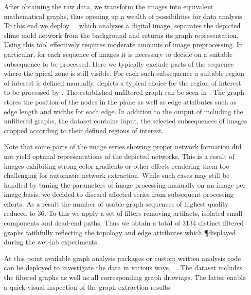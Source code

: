	After obtaining the raw data, we transform the images into equivalent mathematical graphs, thus opening up a wealth of possibilities for data analysis. To this end we deploy \NEFI~\cite{dirnberger2015nefi}, which analyzes a digital image, separates the depicted slime mold network from the background and returns its graph representation. Using this tool effectively requires moderate amounts of image preprocessing. In particular, for each sequence of images it is necessary to decide on a suitable subsequence to be processed. Here we typically exclude parts of the sequence where the apical zone is still visible. For each such subsequence a suitable region of interest is defined manually.  depicts a typical choice for the region of interest to be processed by \NEFI. The established unfiltered graph can be seen in . The graph stores the position of the nodes in the plane as well as edge attributes such as edge length and widths for each edge. In addition to the output of \NEFI including the unfiltered graphs, the dataset contains \NEFIs input, \ie the selected subsequences of images cropped according to their defined regions of interest.

	Note that some parts of the image series showing proper network formation did not yield optimal representations of the depicted networks. This is a result of images exhibiting strong color gradients or other effects rendering them too challenging for automatic network extraction. While such cases may still be handled by tuning the parameters of image processing manually on an image per image basis, we decided to discard affected series from subsequent processing efforts. As a result the number of usable graph sequences of highest quality reduced to $36$. To this we apply a set of filters removing artifacts, isolated small components and dead-end paths. Thus we obtain a total of $3134$ distinct filtered graphs faithfully reflecting the topology and edge attributes which \P displayed during the wet-lab experiments. 

	At this point available graph analysis packages or custom written analysis code can be deployed to investigate the data in various ways, \eg~\cite{ICWSM09154,networkx}. The dataset includes the filtered graphs as well as all corresponding graph drawings. The latter enable a quick visual inspection of the graph extraction results.

